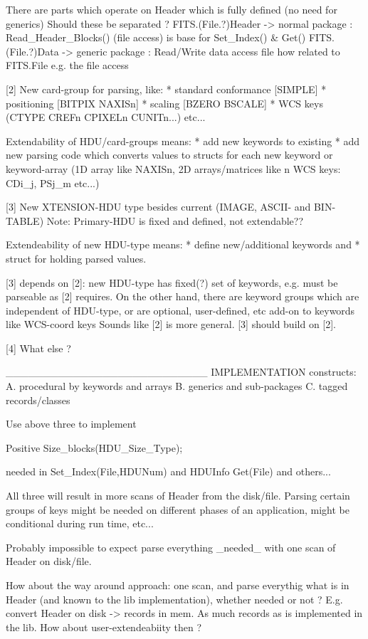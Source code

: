 There are parts which operate on Header which is fully defined (no need for generics)
Should these be separated ?
FITS.(File.?)Header -> normal package  : Read_Header_Blocks() (file access) 
                                         is base for Set_Index() & Get() 
FITS.(File.?)Data   -> generic package : Read/Write data access file
how related to FITS.File e.g. the file access

[2] 
New card-group for parsing, like: 
* standard conformance [SIMPLE]
* positioning [BITPIX NAXISn]
* scaling [BZERO BSCALE]
* WCS keys (CTYPE CREFn CPIXELn CUNITn...)
etc...

Extendability of HDU/card-groups means:
* add new keywords to existing
* add new parsing code which converts values to structs for 
each new keyword or keyword-array 
(1D array like NAXISn, 
2D arrays/matrices like n WCS keys: CDi_j, PSj_m etc...)

[3] 
New XTENSION-HDU type besides current (IMAGE, ASCII- and BIN-TABLE)
Note: Primary-HDU is fixed and defined, not extendable??

Extendeability of new HDU-type means: 
* define new/additional keywords and 
* struct for holding parsed values.

[3] depends on [2]: new HDU-type has fixed(?) set of keywords,
e.g. must be parseable as [2] requires.
On the other hand, there are keyword groups which are independent
of HDU-type, or are optional, user-defined, etc add-on to keywords
like WCS-coord keys
Sounds like [2] is more general. [3] should build on [2].

[4] What else ?

___________________________
IMPLEMENTATION constructs:
A. procedural by keywords and arrays
B. generics and sub-packages
C. tagged records/classes

Use above three to implement

 Positive Size_blocks(HDU_Size_Type);

needed in Set_Index(File,HDUNum) and
HDUInfo Get(File) and others...

All three will result in more scans of Header from the disk/file.
Parsing certain groups of keys might be needed on different
phases of an application, might be conditional during run time, etc...

Probably impossible to expect parse everything _needed_ with one scan
of Header on disk/file.

How about the way around approach: 
one scan, and parse everythig what is in Header (and known to 
the lib implementation), whether needed or not ?
E.g. convert Header on disk -> records in mem. As much records 
as is implemented in the lib. How about user-extendeabiity then ?


